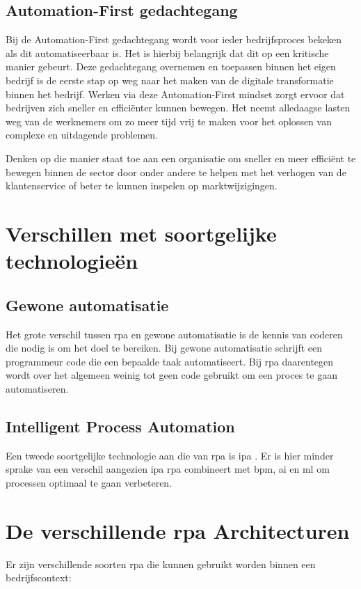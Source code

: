 \subsection{Automation-First gedachtegang}
Bij de Automation-First gedachtegang wordt voor ieder bedrijfsproces bekeken als dit automatiseerbaar is. Het is hierbij belangrijk dat dit op een kritische manier gebeurt. Deze gedachtegang overnemen en toepassen binnen het eigen bedrijf is de eerste stap op weg naar het maken van de digitale transformatie binnen het bedrijf. Werken via deze Automation-First mindset zorgt ervoor dat bedrijven zich sneller en efficiënter kunnen bewegen. Het neemt alledaagse lasten weg van de werknemers om zo meer tijd vrij te maken voor het oplossen van complexe en uitdagende problemen.

Denken op die manier staat toe aan een organisatie om sneller en meer efficiënt te bewegen binnen de sector door onder andere te helpen met het verhogen van de klantenservice of beter te kunnen inspelen op marktwijzigingen.

\section{Verschillen met soortgelijke technologieën}

\subsection{Gewone automatisatie}
Het grote verschil tussen \acrshort{rpa} en gewone automatisatie is de kennis van coderen die nodig is om het doel te bereiken. Bij gewone automatisatie schrijft een programmeur code die een bepaalde taak automatiseert. Bij \acrshort{rpa} daarentegen wordt over het algemeen weinig tot geen code gebruikt om een proces te gaan automatiseren. \autocite{rpaVsScript}

\subsection{Intelligent Process Automation}
Een tweede soortgelijke technologie aan die van \acrshort{rpa} is \acrfull{ipa} . Er is hier minder sprake van een verschil aangezien \acrshort{ipa} \acrshort{rpa} combineert met \acrshort{bpm}, \acrshort{ai} en \acrfull{ml} om processen optimaal te gaan verbeteren.
\autocite{everythingRPA}

\section{De verschillende \acrshort{rpa} Architecturen}
Er zijn verschillende soorten \acrshort{rpa} die kunnen gebruikt worden binnen een bedrijfscontext:

